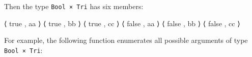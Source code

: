 \begin{fence}
\begin{code}%
\>[0]\AgdaSpace{}%
\AgdaSpace{}%
\AgdaSymbol{:}\AgdaSpace{}%
\AgdaSpace{}%
\<%
\\
\>[0][@{}l@{\AgdaIndent{0}}]%
\>[2]%
\>[8]\AgdaSymbol{:}\AgdaSpace{}%
\<%
\\
%
\>[2]\AgdaSpace{}%
\AgdaSymbol{:}\AgdaSpace{}%
\<%
\\
%
\\[\AgdaEmptyExtraSkip]%
\>[0]\AgdaSpace{}%
\AgdaSpace{}%
\AgdaSymbol{:}\AgdaSpace{}%
\AgdaSpace{}%
\<%
\\
\>[0][@{}l@{\AgdaIndent{0}}]%
\>[2]\AgdaSpace{}%
\AgdaSymbol{:}\AgdaSpace{}%
\<%
\\
%
\>[2]\AgdaSpace{}%
\AgdaSymbol{:}\AgdaSpace{}%
\<%
\\
%
\>[2]\AgdaSpace{}%
\AgdaSymbol{:}\AgdaSpace{}%
\<%
\end{code}
\end{fence}

Then the type \texttt{Bool\ ×\ Tri} has six members:

\begin{myDisplay}
⟨ true  , aa ⟩    ⟨ true  , bb ⟩    ⟨ true ,  cc ⟩
⟨ false , aa ⟩    ⟨ false , bb ⟩    ⟨ false , cc ⟩
\end{myDisplay}

For example, the following function enumerates all possible arguments of
type \texttt{Bool\ ×\ Tri}:

